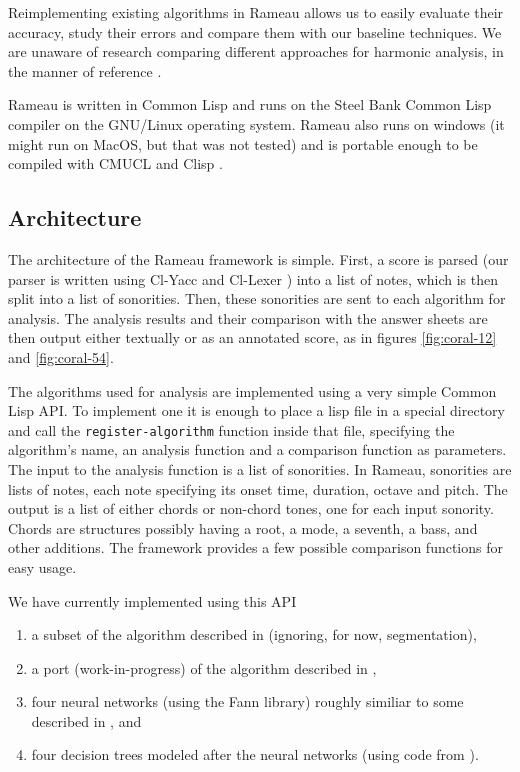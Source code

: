 \documentclass{article}
\begin{document}
Reimplementing existing algorithms in Rameau allows us to easily
evaluate their accuracy, study their errors and compare them with our
baseline techniques. We are unaware of research comparing different
approaches for harmonic analysis, in the manner of reference
\cite{gomez.ea:song}.

Rameau is written in Common Lisp and runs on the Steel Bank Common
Lisp \cite{team:sbcl} compiler on the GNU/Linux operating
system. Rameau also runs on windows (it might run on MacOS, but that was
not tested) and is portable enough to be compiled with CMUCL
\cite{maclachlan:cmucl} and Clisp
\cite{haible.ea:clisp}.

\subsection{Architecture}
\label{sec:architecture-and-api}

The architecture of the Rameau framework is simple. First, a score is
parsed (our parser is written using Cl-Yacc
\cite{chroboczek:cl-yacc} and Cl-Lexer
\cite{parker:lexer}) into a list of notes, which is then split
into a list of sonorities. Then, these sonorities are sent to each
algorithm for analysis. The analysis results and their comparison with
the answer sheets are then output either textually or as an annotated
score, as in figures \ref{fig:coral-12} and \ref{fig:coral-54}.

The algorithms used for analysis are implemented using a very simple
Common Lisp API. To implement one it is enough to place a lisp file in
a special directory and call the \texttt{register-algorithm} function
inside that file, specifying the algorithm's name, an analysis
function and a comparison function as parameters. The input to the
analysis function is a list of sonorities. In Rameau, sonorities are
lists of notes, each note specifying its onset time, duration, octave
and pitch. The output is a list of either chords or non-chord tones,
one for each input sonority. Chords are structures possibly having a
root, a mode, a seventh, a bass, and other additions. The
framework provides a few possible comparison functions for easy
usage.

We have currently implemented using this API 
\begin{enumerate}
\item a subset of the algorithm described in \cite{pardo.ea:algorithms}
  (ignoring, for now, segmentation), 
\item a port (work-in-progress) of the algorithm described in
  \cite{temperley.ea:modeling}, 
\item four neural networks (using the Fann \cite{nissen:fann}
  library) roughly similiar to some described in
  \cite{tsui:harmonic}, and
\item four decision trees modeled after the neural networks (using code
  from \cite{mitchell:machine}).
\end{enumerate}
\end{document}
